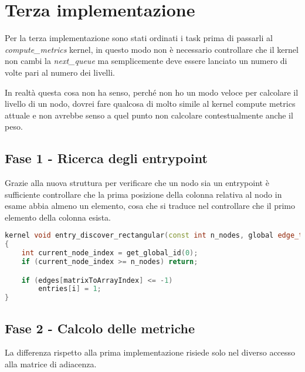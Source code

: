 \documentclass[../relazione.tex]{subfiles}
\begin{document}
\section{Terza implementazione}

Per la terza implementazione sono stati ordinati i task prima di passarli al \textit{compute\_metrics} kernel, in questo modo non è necessario controllare che il kernel non cambi la \textit{next\_queue} ma semplicemente deve essere lanciato un numero di volte pari al numero dei livelli.

In realtà questa cosa non ha senso, perché non ho un modo veloce per calcolare il livello di un nodo, dovrei fare qualcosa di molto simile al kernel compute metrics attuale e non avrebbe senso a quel punto non calcolare contestualmente anche il peso.

\subsection{Fase 1 - Ricerca degli entrypoint}
Grazie alla nuova struttura per verificare che un nodo sia un entrypoint è sufficiente controllare che la prima posizione della colonna relativa al nodo in esame abbia almeno un elemento, cosa che si traduce nel controllare che il primo elemento della colonna esista. 
\begin{lstlisting}[language=C++, caption={Find entrypoints kernel II},captionpos=b]
kernel void entry_discover_rectangular(const int n_nodes, global edge_t* restrict edges, volatile global int* n_entries, global int* entries)
{
	int current_node_index = get_global_id(0);
	if (current_node_index >= n_nodes) return;

	if (edges[matrixToArrayIndex] <= -1)
		entries[i] = 1;
}
\end{lstlisting}

\subsection{Fase 2 - Calcolo delle metriche}
La differenza rispetto alla prima implementazione risiede solo nel diverso accesso alla matrice di adiacenza.
\end{document}
